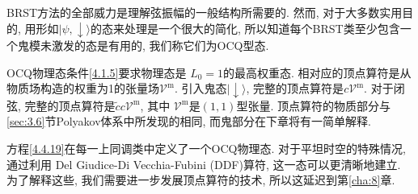 BRST方法的全部威力是理解弦振幅的一般结构所需要的. 然而, 对于大多数实用目的, 用形如$|\psi,\downarrow\rangle$的态来处理是一个很大的简化, 
所以知道每个BRST类至少包含一个鬼模未激发的态是有用的, 我们称它们为OCQ型态.

OCQ物理态条件\eqref{4.1.5}要求物理态是 $L_{0}=1$的最高权重态. 相对应的顶点算符是从物质场构造的权重为1的张量场$\mathscr{V}^{\mathrm{m}}$. 
引入鬼态$\lvert\downarrow\rangle$, 完整的顶点算符是$c \mathscr{V}^{\mathrm{m}}$. 对于闭弦, 完整的顶点算符是$\tilde{c} c \mathscr{V}^{\mathrm{m}}$, 
其中 $\mathscr{V}^{\mathrm{m}}$是$(1,1)$型张量. 顶点算符的物质部分与\ref{sec:3.6}节Polyakov体系中所发现的相同, 而鬼部分在下章将有一简单解释.

方程\eqref{4.4.19}在每一上同调类中定义了一个OCQ物理态. 对于平坦时空的特殊情况, 通过利用 Del Giudice-Di Vecchia-Fubini (DDF)算符, 这一态可以更清晰地建立. 
为了解释这些, 我们需要进一步发展顶点算符的技术, 所以这延迟到第\ref{cha:8}章.